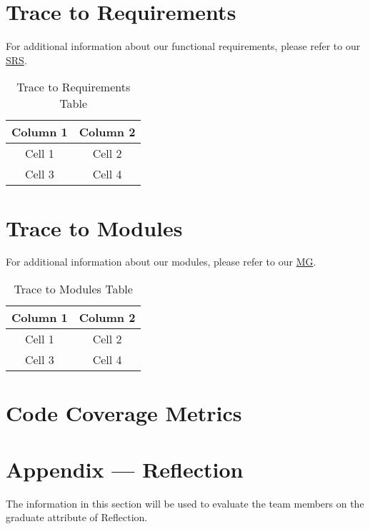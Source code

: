 \documentclass[12pt, titlepage]{article}
\begin{document}
\section{Trace to Requirements}
  For additional information about our functional requirements, please refer to our \href{https://github.com/RezaJodeiri/CXR-Capstone/blob/main/docs/SRS/SRS.pdf}{SRS}.
  \begin{table}[h!]
  \centering
  \begin{tabular}{|c|c|}
  \hline
  \textbf{Column 1} & \textbf{Column 2} \\ \hline
  Cell 1            & Cell 2            \\ \hline
  Cell 3            & Cell 4            \\ \hline
  \end{tabular}
  \caption{Trace to Requirements Table} 
  \label{tab:2by2}
  \end{table}
\section{Trace to Modules}	
For additional information about our modules, please refer to our \href{https://github.com/RezaJodeiri/CXR-Capstone/blob/main/docs/Design/SoftArchitecture/MG.pdf}{MG}.	
\begin{table}[h!]
  \centering
  \begin{tabular}{|c|c|}
  \hline
  \textbf{Column 1} & \textbf{Column 2} \\ \hline
  Cell 1            & Cell 2            \\ \hline
  Cell 3            & Cell 4            \\ \hline
  \end{tabular}
  \caption{Trace to Modules Table} 
  \end{table}
\section{Code Coverage Metrics}






\newpage{}
\section*{Appendix --- Reflection}

The information in this section will be used to evaluate the team members on the
graduate attribute of Reflection.
\end{document}
